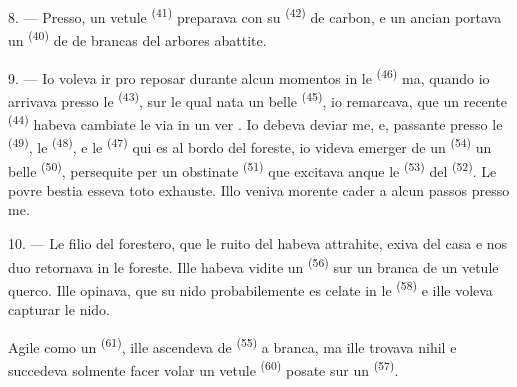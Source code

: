 8. --- Presso, un vetule  \textsuperscript{(41)} preparava con
su  \textsuperscript{(42)} de carbon, e un ancian
portava un  \textsuperscript{(40)} de  de
brancas del arbores abattite.

\VUsaut{3.0mm}
\VUsaut{3.0mm}

9. --- Io voleva ir pro reposar durante alcun momentos in le  \textsuperscript{(46)} ma, quando io arrivava presso le  \textsuperscript{(43)}, sur le qual nata un belle 
\textsuperscript{(45)}, io remarcava, que un recente 
\textsuperscript{(44)} habeva cambiate le via in un ver . Io
debeva deviar me, e, passante presso le  \textsuperscript{(49)},
le  \textsuperscript{(48)}, e le 
\textsuperscript{(47)} qui es al bordo del foreste, io videva emerger de un
 \textsuperscript{(54)} un belle 
\textsuperscript{(50)}, persequite per un obstinate 
\textsuperscript{(51)} que excitava anque le  \textsuperscript{(53)}
del  \textsuperscript{(52)}. Le povre bestia
esseva toto exhauste. Illo veniva morente cader a alcun passos presso me.

10. --- Le filio del forestero, que le ruito del  habeva
attrahite, exiva del casa e nos duo retornava in le foreste. Ille habeva vidite
un  \textsuperscript{(56)} sur un branca de un vetule querco. Ille
opinava, que su nido probabilemente es celate in le 
\textsuperscript{(58)} e ille voleva capturar le nido.

Agile como un  \textsuperscript{(61)}, ille ascendeva de
 \textsuperscript{(55)} a branca, ma ille trovava nihil e
succedeva solmente facer volar un vetule  \textsuperscript{(60)}
posate sur un  \textsuperscript{(57)}.
\VUsaut{4.0mm}
\VUfilet{22mm}
